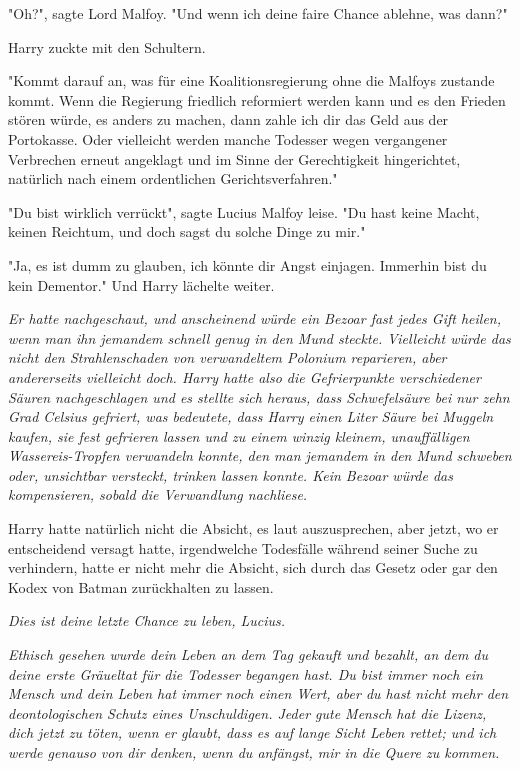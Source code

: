 {"Oh?", sagte Lord Malfoy. "Und wenn ich deine faire Chance ablehne, was dann?"

Harry zuckte mit den Schultern.

"Kommt darauf an, was für eine Koalitionsregierung ohne die Malfoys zustande kommt. Wenn die Regierung friedlich reformiert werden kann und es den Frieden stören würde, es anders zu machen, dann zahle ich dir das Geld aus der Portokasse. Oder vielleicht werden manche Todesser wegen vergangener Verbrechen erneut angeklagt und im Sinne der Gerechtigkeit hingerichtet, natürlich nach einem ordentlichen Gerichtsverfahren."

"Du bist wirklich verrückt", sagte Lucius Malfoy leise. "Du hast keine Macht, keinen Reichtum, und doch sagst du solche Dinge zu mir."

"Ja, es ist dumm zu glauben, ich könnte dir Angst einjagen. Immerhin bist du kein Dementor." Und Harry lächelte weiter.

\emph{Er hatte nachgeschaut, und anscheinend würde ein Bezoar fast jedes Gift heilen, wenn man ihn jemandem schnell genug in den Mund steckte. Vielleicht würde das nicht den Strahlenschaden von verwandeltem Polonium reparieren, aber andererseits vielleicht doch. Harry hatte also die Gefrierpunkte verschiedener Säuren nachgeschlagen und es stellte sich heraus, dass Schwefelsäure bei nur zehn Grad Celsius gefriert, was bedeutete, dass Harry einen Liter Säure bei Muggeln kaufen, sie fest gefrieren lassen und zu einem winzig kleinem, unauffälligen Wassereis-Tropfen verwandeln konnte, den man jemandem in den Mund schweben oder, unsichtbar versteckt, trinken lassen konnte. Kein Bezoar würde das kompensieren, sobald die Verwandlung nachliese.}

Harry hatte natürlich nicht die Absicht, es laut auszusprechen, aber jetzt, wo er entscheidend versagt hatte, irgendwelche Todesfälle während seiner Suche zu verhindern, hatte er nicht mehr die Absicht, sich durch das Gesetz oder gar den Kodex von Batman zurückhalten zu lassen.

\emph{Dies ist deine letzte Chance zu leben, Lucius.}

\emph{Ethisch gesehen wurde dein Leben an dem Tag gekauft und bezahlt, an dem du deine erste Gräueltat für die Todesser begangen hast. Du bist immer noch ein Mensch und dein Leben hat immer noch einen Wert, aber du hast nicht mehr den deontologischen Schutz eines Unschuldigen. Jeder gute Mensch hat die Lizenz, dich jetzt zu töten, wenn er glaubt, dass es auf lange Sicht Leben rettet; und ich werde genauso von dir denken, wenn du anfängst, mir in die Quere zu kommen.}

}
